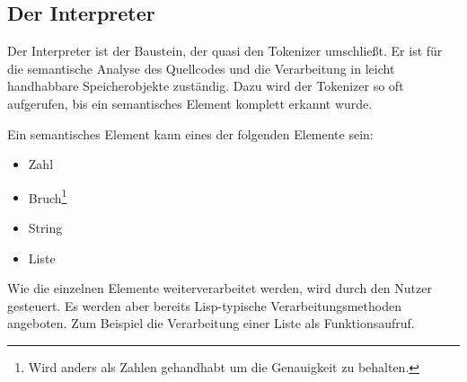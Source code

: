 \subsection{Der Interpreter}

Der Interpreter ist der Baustein, der quasi den Tokenizer umschließt.
Er ist für die semantische Analyse des Quellcodes und die Verarbeitung in
leicht handhabbare Speicherobjekte zuständig. Dazu wird der Tokenizer so oft
aufgerufen, bis ein semantisches Element komplett erkannt wurde.

Ein semantisches Element kann eines der folgenden Elemente sein:

\begin{itemize}
\item{Zahl}
\item{Bruch\footnote{Wird anders als Zahlen gehandhabt um die Genauigkeit zu behalten.}}
\item{String}
\item{Liste}
\end{itemize}

Wie die einzelnen Elemente weiterverarbeitet werden,
wird durch den Nutzer gesteuert.
Es werden aber bereits Lisp-typische Verarbeitungsmethoden angeboten.
Zum Beispiel die Verarbeitung einer Liste als Funktionsaufruf.

